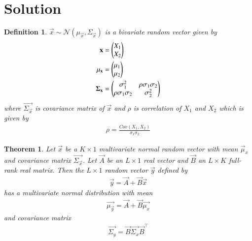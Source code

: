 \documentclass[journal,12pt,twocolumn]{IEEEtran}
\newtheorem{theorem}{Theorem}[section]
\newtheorem{definition}{Definition}[section]
\begin{document}
\section*{Solution}
\begin{definition}
    $\vec{x}\sim\mathcal{N}(\mu_{\vec{x}},\Sigma_{\vec{x}})$ is a bivariate random vector given by
    \begin{align}
        \mathbf{x}&=\begin{pmatrix}X_1\\
                       X_2\end{pmatrix}\\
        \mathbf{\mu_{\mathbf{x}}}&=\begin{pmatrix}\mu_1\\
                                    \mu_2\end{pmatrix}\\
        \mathbf{\Sigma_{\mathbf{x}}}&=\begin{pmatrix}\sigma_1^2&\rho\sigma_1\sigma_2\\
                                        \rho\sigma_1\sigma_2&\sigma_2^2\end{pmatrix}
    \end{align}
    where $\vec{\Sigma_{\vec{x}}}$ is covariance matrix of $\vec{x}$ and $\rho$ is correlation of $X_1$ and $X_2$ which is given by
    \begin{align}
        \rho=\frac{Cov(X_1,X_2)}{\sigma_1\sigma_2}
    \end{align}
\end{definition}
\begin{theorem}
     Let $\vec{x}$ be a $K\times1$ multivariate normal random vector with mean $\vec{\mu}_x$ and covariance matrix $\vec{\Sigma_{\vec{x}}}$. Let $\vec{A}$ be an $L\times1$ real vector and $\vec{B}$ an $L\times K$ full-rank real matrix. Then the $L\times1$ random vector $\vec{y}$ defined by
     \begin{align}
         \vec{y}=\vec{A}+\vec{B}\vec{x}
     \end{align}
     has a multivariate normal distribution with mean
     \begin{align}
         \vec{\mu_\vec{y}}=\vec{A}+\vec{B}\vec{\mu_x}
     \end{align}
     and covariance matrix
     \begin{align}
         \vec{\Sigma_y}=\vec{B}\vec{\Sigma_x}\vec{B}^{\top}
     \end{align}
\end{theorem}
\end{document}
